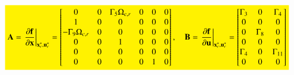 \documentclass[3p]{elsarticle}
\begin{document}


\begin{equation}
    \colorbox{yellow}{$
    \mathbf{A} = \left.\dfrac{\partial \mathbf{f}}{\partial \mathbf{x}}\right|_{\boldsymbol{{\mathrm{x}}}_e^*, \boldsymbol{{\mathrm{u}}}_e^*} = \begin{bmatrix}
        0 & 0 & \Gamma_5 \Omega_{c, r} & 0 & 0 & 0 \\
        1 & 0 & 0 & 0 & 0 & 0 \\
        -\Gamma_9 \Omega_{c, r} & 0 & 0 & 0 & 0 & 0 \\
        0 & 0 & 1 & 0 & 0 & 0 \\
        0 & 0 & 0 & 0 & 0 & 0 \\
        0 & 0 & 0 & 0 & 1 & 0
    \end{bmatrix}, \quad \mathbf{B} = \left.\dfrac{\partial \mathbf{f}}{\partial \mathbf{u}}\right|_{\boldsymbol{{\mathrm{x}}}_e^*, \boldsymbol{{\mathrm{u}}}_e^*} = 
    \begin{bmatrix}
       \Gamma_3 & 0 & \Gamma_4\\
       0 & 0 & 0 \\
       0 & \Gamma_8 & 0 \\
       0 & 0 & 0 \\
       \Gamma_4 & 0 & \Gamma_{11} \\
       0 & 0 & 0
   \end{bmatrix}$}
\end{equation}
\end{document}
